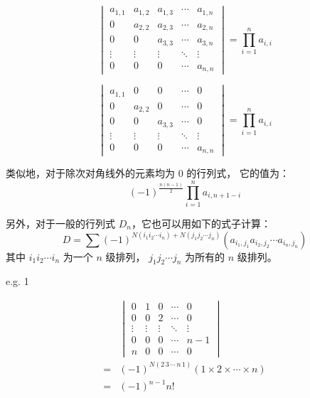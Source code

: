 \documentclass[UTF8]{article}
\begin{document}
	\begin{equation*}
		\begin{vmatrix}
			a_{1, 1} & a_{1, 2} & a_{1, 3} & \cdots & a_{1, n}
			\\
			0 & a_{2, 2} & a_{2, 3} & \cdots & a_{2, n}
			\\
			0 & 0 & a_{3, 3} & \cdots & a_{3, n}
			\\
			\vdots & \vdots & \vdots & \ddots & \vdots
			\\
			0 & 0 & 0 & \cdots & a_{n, n}
		\end{vmatrix}
		=
		\prod_{i = 1}^{n} a_{i, i}
	\end{equation*}
	\bigskip

	\begin{equation*}
		\begin{vmatrix}
			a_{1, 1} & 0 & 0 & \cdots & 0
			\\
			0 & a_{2, 2} & 0 & \cdots & 0
			\\
			0 & 0 & a_{3, 3} & \cdots & 0
			\\
			\vdots & \vdots & \vdots & \ddots & \vdots
			\\
			0 & 0 & 0 & \cdots & a_{n, n}
		\end{vmatrix}
		=
		\prod_{i = 1}^{n} a_{i, i}
	\end{equation*}
	\bigskip

	类似地，对于除次对角线外的元素均为 $0$ 的行列式，
	它的值为：
	$$
	(-1)^{\frac {n(n - 1)} {2}} \prod_{i = 1}^{n} a_{i, n + 1 - i}
	$$

	\bigskip

	另外，对于一般的行列式 $D_n$，它也可以用如下的式子计算：
	\begin{equation*}
		D = \sum (-1)^{N(i_1 i_2 \cdots i_n) + N(j_1 j_2 \cdots j_n)}
		(a_{i_1, j_1} a_{i_2, j_2} \cdots a_{i_n, j_n})
	\end{equation*}
	其中 $i_1 i_2 \cdots i_n$ 为一个 $n$ 级排列，
	$j_1 j_2 \cdots j_n$ 为所有的 $n$ 级排列。

	\bigskip


	e.g. 1

	\begin{align*}
		&
		\begin{vmatrix}
			0 & 1 & 0 & \cdots & 0
			\\
			0 & 0 & 2 & \cdots & 0
			\\
			\vdots & \vdots & \vdots & \ddots & \vdots
			\\
			0 & 0 & 0 & \cdots & n - 1
			\\
			n & 0 & 0 & \cdots & 0
		\end{vmatrix}
		\\=&
		(-1)^{N(2 \, 3 \, \cdots \, n \, 1)} (1 \times 2 \times \cdots \times n)
		\\=&
		(-1)^{n - 1} n!
	\end{align*}
\end{document}
